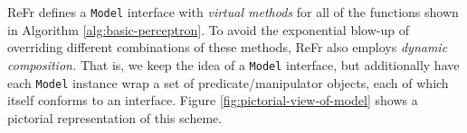 \documentclass[a4paper]{article}
\newenvironment{lyxcode}
{\par\begin{list}{}{
\scriptsize
\setlength{\leftmargin}{0.1in}
\setlength{\rightmargin}{\leftmargin}
\setlength{\listparindent}{0pt}%
\raggedright
\setlength{\itemsep}{0pt}
\setlength{\parsep}{0pt}
\normalfont\ttfamily}%
 \item[]}
{\end{list}}
\begin{document}

ReFr defines a \texttt{Model} interface with \emph{virtual methods} for all of the functions shown in Algorithm \ref{alg:basic-perceptron}.  To avoid the exponential blow-up of overriding different combinations of these methods, ReFr also employs \emph{dynamic composition. } That is, we
keep\emph{ }the idea of a \texttt{Model} interface, but additionally
have each \texttt{Model} instance wrap a set of predicate/manipulator
objects, each of which itself conforms to an interface. Figure \ref{fig:pictorial-view-of-model}
shows a pictorial representation of this scheme.
\end{document}

